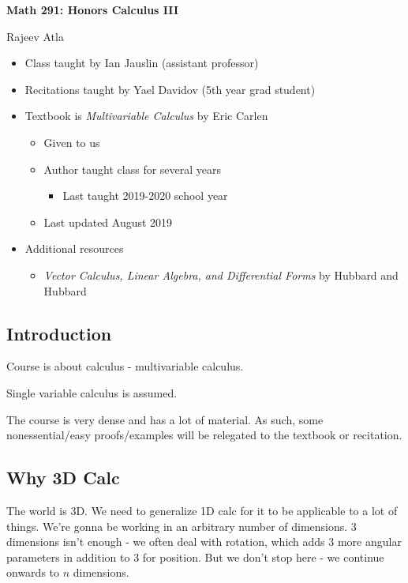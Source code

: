 \documentclass[11pt]{article}
\begin{document}
\begin{center}
    \Large \textbf{Math 291: Honors Calculus III}
\end{center}
\begin{center}
    \Large Rajeev Atla
\end{center}

\begin{itemize}
\item Class taught by Ian Jauslin (assistant professor)
\item Recitations taught by Yael Davidov (5th year grad student)
\item Textbook is \emph{Multivariable Calculus} by Eric Carlen \cite{carlen}
  \begin{itemize}
  \item Given to us
  \item Author taught class for several years
    \begin{itemize}
    \item Last taught 2019-2020 school year
    \end{itemize}
  \item Last updated August 2019
  \end{itemize}
\item Additional resources
  \begin{itemize}
  \item \emph{Vector Calculus, Linear Algebra, and Differential Forms} by Hubbard and Hubbard \cite{hubbard}
  \end{itemize}
\end{itemize}

\newpage

\doublespacing
\tableofcontents
\singlespacing


\subsection{Introduction}
Course is about calculus - multivariable calculus.

Single variable calculus is assumed.

The course is very dense and has a lot of material.
As such, some nonessential/easy proofs/examples will be relegated to the textbook or recitation.


\subsection{Why 3D Calc}
The world is 3D.
We need to generalize 1D calc for it to be applicable to a lot of things.
We're gonna be working in an arbitrary number of dimensions.
3 dimensions isn't enough - we often deal with rotation, which adds 3 more angular parameters in addition to 3 for position.
But we don't stop here - we continue onwards to $n$ dimensions.
\end{document}
